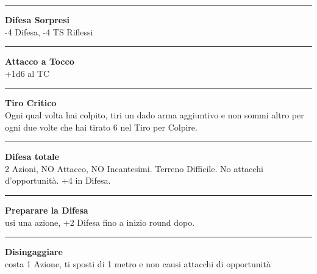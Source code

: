 \documentclass[a4paper,12 pt,openany]{book}
\newcommand{\riga}{\rule{\textwidth}{0.4pt}}
\begin{document}
\begin{textblock*}{6.2cm}
\riga

\textbf{Difesa Sorpresi}\\ -4 Difesa, -4 TS Riflessi

\riga

\textbf{Attacco a Tocco}\\ +1d6 al TC

\riga

\textbf{Tiro Critico}\\
Ogni qual volta hai colpito, tiri un dado arma aggiuntivo e non sommi altro per ogni due volte che hai tirato 6 nel Tiro per Colpire.

\riga


\textbf{Difesa totale}\\
2 Azioni, NO Attacco, NO Incantesimi. Terreno Difficile. No attacchi d'opportunità. +4 in Difesa.

\riga

\textbf{Preparare la Difesa}\\
usi una azione, +2 Difesa fino a inizio round dopo.


\riga

\textbf{Disingaggiare}\\
costa 1 Azione, ti sposti di 1 metro e non causi attacchi di opportunità

\end{textblock*}



~\newpage
\end{document}
